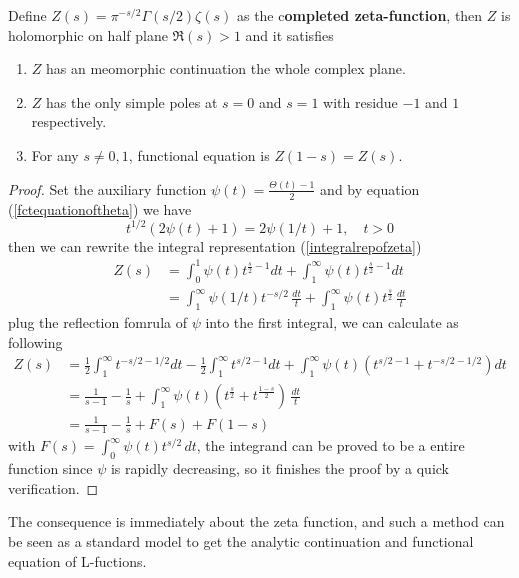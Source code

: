 \begin{colortheorem} \label{completedzetafct}
    Define \(Z(s) = \pi^{-s/2} \Gamma(s/2) \zeta(s)\) as the c\textbf{ompleted zeta-function}, then \(Z\) is holomorphic on half plane \(\Re(s) >1\) and it satisfies
    \begin{enumerate}
        \item \(Z\) has an meomorphic continuation the whole complex plane.
        \item \(Z\) has the only simple poles at \(s = 0\) and \(s = 1\) with residue \(-1\) and \(1\) respectively.
        \item For any \(s \neq 0,1\), functional equation is \(Z(1-s) = Z(s)\).
    \end{enumerate}
\end{colortheorem}
\begin{proof}
    Set the auxiliary function \(\psi(t) = \frac{\Theta(t) - 1}{2}\) and by equation (\ref{fctequationoftheta}) we have
    \[t^{1/2}(2\psi(t)+1) = 2\psi(1/t)+1, \quad t>0\]
    then we can rewrite the integral representation (\ref{integralrepofzeta}) 
    \begin{align*}
        Z(s) &=  \int_0^{1} \psi(t) t^{\frac{s}{2}-1} dt +  \int_1^{\infty} \psi(t) t^{\frac{s}{2}-1} dt \\
        &=  \int_1^{\infty} \psi(1/t) t^{-s/2} \, \frac{dt}{t} +  \int_1^{\infty} \psi(t) t^{\frac{s}{2}} \, \frac{dt}{t}
    \end{align*}
    plug the reflection fomrula of \(\psi\) into the first integral, we can calculate as following
    \begin{align*}
        Z(s) &=  \frac{1}{2}\int_1^{\infty}t^{-s/2-1/2} dt - \frac{1}{2}\int_1^{\infty} t^{s/2 -1} dt + \int_1^{\infty} \psi(t) (t^{s/2 -1} + t^{-s/2 -1/2}) dt \\
        &= \frac{1}{s-1} - \frac{1}{s} + \int_1^{\infty} \psi(t) (t^{\frac{s}{2}}+ t^{\frac{1-s}{2}}) \, \frac{dt}{t} \\
        &= \frac{1}{s-1} - \frac{1}{s} + F(s) + F(1-s)
    \end{align*}
    with \(F(s) = \int_0^{\infty} \psi(t) t^{s/2} \, dt\), the integrand can be proved to be a entire function since \(\psi\) is rapidly decreasing, so it finishes the proof by a quick verification.
\end{proof}

The consequence is immediately about the zeta function, and such a method can be seen as a standard model to get the analytic continuation and functional equation of L-fuctions.

